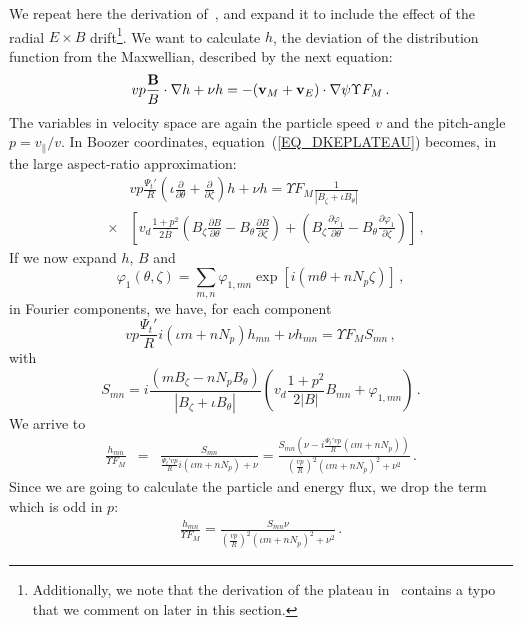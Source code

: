 We repeat here the derivation of~\citep{alonso2017JPP}, and expand it to include the effect of the radial $E\times B$ drift\footnote{Additionally, we note that the derivation of the plateau in~\citep{alonso2017JPP} contains a typo that we comment on later in this section.}. We want to calculate $h$, the deviation of the distribution function from the Maxwellian, described by the next equation:
 \begin{equation}
 vp\frac{\mathbf{B}}{B}\cdot\mathbf{\nabla} h + \nu h = -({\mathbf{v}}_M+{\mathbf{v}}_E)\cdot\mathbf{\nabla}\psi \Upsilon F_M\,.\label{EQ_DKEPLATEAU}
 \end{equation}
 The variables in velocity space are again the particle speed $v$ and the pitch-angle $p=v_\parallel/v$. In Boozer coordinates,  equation~(\ref{EQ_DKEPLATEAU}) becomes, in the large aspect-ratio approximation:
 \begin{eqnarray}
& &vp\frac{\Psi_t'}{R}\left(\iota\frac{\partial}{\partial \theta}+\frac{\partial}{\partial \zeta}\right) h + \nu h = \Upsilon F_M\frac{1}{|B_\zeta+\iota B_\theta|} \nonumber\\  &\times& \left[v_d\frac{1+p^2}{2\overline{B}}\left(B_\zeta\frac{\partial B}{\partial \theta}-B_\theta\frac{\partial B}{\partial \zeta}\right)+\left(B_\zeta\frac{\partial \varphi_1}{\partial \theta}-B_\theta\frac{\partial \varphi_1}{\partial \zeta}\right)\right]\,,
 \end{eqnarray}
 If we now expand $h$, $B$ and 
 \begin{equation}
 \varphi_1(\theta,\zeta) =  \sum_{m,n} \varphi_{1,mn}\exp{[i(m\theta+nN_p\zeta)]}\,,
 \end{equation}
 in Fourier components, we have, for each component
 \begin{equation}
vp\frac{\Psi_t'}{R}i(\iota m + nN_p) h_{mn} + \nu h_{mn} = \Upsilon F_M S_{mn}\,,
 \end{equation}
 with
  \begin{equation}
S_{mn}=   i\frac{(mB_\zeta -nN_pB_\theta)}{|B_\zeta+\iota B_\theta|}\left(v_d\frac{1+p^2}{2|B|}B_{mn}+\varphi_{1,mn}\right)\,.
 \end{equation}
We arrive to
 \begin{eqnarray}
 \frac{h_{mn}}{\Upsilon F_M} &=& \frac{S_{mn}}{\frac{\Psi_t'vp}{R}i(\iota m + nN_p)+\nu} = \frac{S_{mn}\left(\nu-i\frac{\Psi_t'vp}{R}(\iota m + nN_p)\right)}{\left(\frac{vp}{R}\right)^2(\iota m + nN_p)^2+\nu^2}\,.
 \end{eqnarray}
 Since we are going to calculate the particle and energy flux, we drop the term which is odd in $p$:
 \begin{eqnarray}
 \frac{h_{mn}}{\Upsilon F_M}  = \frac{S_{mn}\nu}{\left(\frac{vp}{R}\right)^2(\iota m + nN_p)^2+\nu^2}\,.
 \end{eqnarray}

